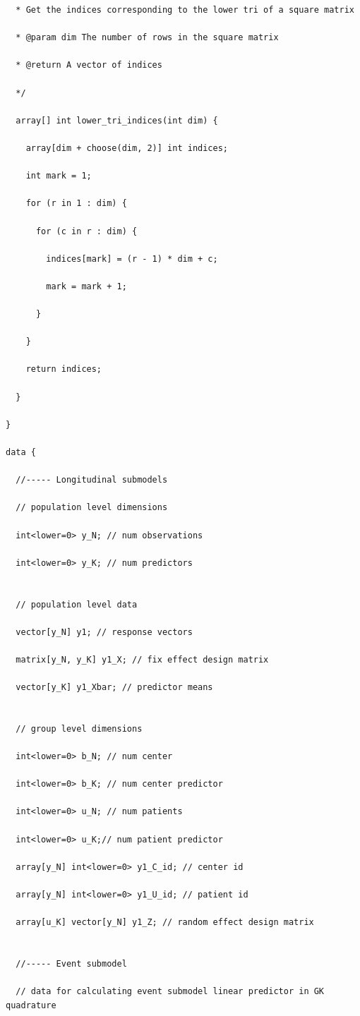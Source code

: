 \begin{SingleSpace}
\begin{verbatim}
  * Get the indices corresponding to the lower tri of a square matrix

  * @param dim The number of rows in the square matrix

  * @return A vector of indices

  */

  array[] int lower_tri_indices(int dim) {

    array[dim + choose(dim, 2)] int indices;

    int mark = 1;

    for (r in 1 : dim) {

      for (c in r : dim) {

        indices[mark] = (r - 1) * dim + c;

        mark = mark + 1;

      }

    }

    return indices;

  }

}

data {

  //----- Longitudinal submodels

  // population level dimensions

  int<lower=0> y_N; // num observations

  int<lower=0> y_K; // num predictors

  
  // population level data

  vector[y_N] y1; // response vectors

  matrix[y_N, y_K] y1_X; // fix effect design matrix

  vector[y_K] y1_Xbar; // predictor means


  // group level dimensions

  int<lower=0> b_N; // num center

  int<lower=0> b_K; // num center predictor

  int<lower=0> u_N; // num patients

  int<lower=0> u_K;// num patient predictor

  array[y_N] int<lower=0> y1_C_id; // center id 

  array[y_N] int<lower=0> y1_U_id; // patient id 

  array[u_K] vector[y_N] y1_Z; // random effect design matrix


  //----- Event submodel

  // data for calculating event submodel linear predictor in GK quadrature


\end{verbatim}
\end{SingleSpace}
